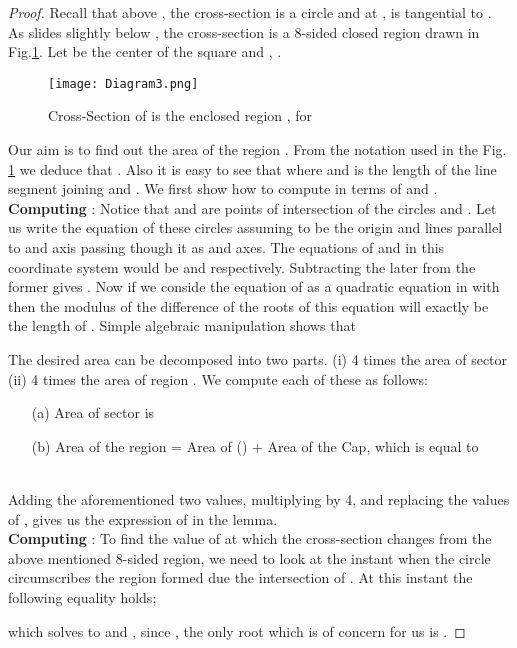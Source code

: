 \documentclass[conference]{IEEEtran}
\begin{document}
\begin{proof}
Recall that above , the cross-section is a circle and at ,   is tangential to . As 
slides slightly below , the cross-section is a 8-sided closed region drawn in Fig.\ref{z2}. Let 
be the center of the square and , .
\begin{figure}
\centering
\texttt{[image: Diagram3.png]}
\caption{Cross-Section of  is the enclosed region , for }
\label{z2}
\end{figure}
Our aim is to find out the area of  the region . From the notation used in the Fig. \ref{z2} we deduce that
. Also it is easy to see that  where  and
 is the length of the line segment joining  and . We first show how to compute  in terms of  and . \\
\textbf{Computing }:
Notice that  and  are points of intersection of the circles  and . Let us write the equation
of these circles assuming  to be the origin and lines parallel to  and  axis passing though it as  and  axes.
The equations of  and  in this coordinate system would be  and
 respectively. Subtracting the later from the former gives
. Now if we conside the equation of 
as a quadratic equation in  with  then the modulus of the difference of the
roots of this equation will exactly be the length of . Simple algebraic manipulation shows that


The desired area can be decomposed into two parts. (i) 4 times the area
of sector  (ii) 4 times the area of region . We compute each of these as follows:
\begin{itemize}
\item[(a)] Area of sector  is
\small

\item[(b)] Area of the region  =  Area of () + Area of the Cap, which is equal to \\
 \\


\end{itemize}
Adding the aforementioned two values, multiplying by 4, and replacing the values of , gives us the expression of  in the lemma. \\
\textbf{Computing }:
To find the value of  at which the cross-section changes from the above mentioned 8-sided region, we need
to look at the instant when the circle  circumscribes the region formed due the intersection of
. At this instant the following equality holds;
\small

which solves to  and , since , the only root which is of concern for
us is .
\end{proof}
\end{document}
